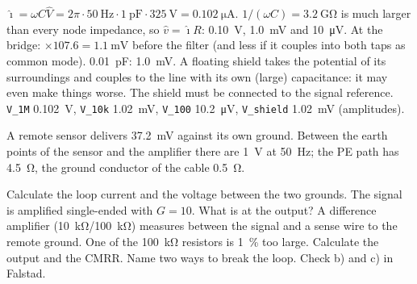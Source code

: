 \begin{solution}
\begin{talist}
\ta $\hat\imath = \omega C\hat V = 2\pi\cdot\SI{50}{\hertz}\cdot\SI{1}{\pico\farad}\cdot\SI{325}{\volt} = \SI{0.102}{\micro\ampere}$.
\ta $1/(\omega C) = \SI{3.2}{\giga\ohm}$ is much larger than every node impedance, so $\hat v = \hat\imath R$:
	\SI{0.10}{\volt}, \SI{1.0}{\milli\volt} and \SI{10}{\micro\volt}. At the bridge: $\times 107.6 = \SI{1.1}{\milli\volt}$ before
	the filter (and less if it couples into both taps as common mode).
\ta \SI{0.01}{\pico\farad}: \SI{1.0}{\milli\volt}.
\ta A floating shield takes the potential of its surroundings and couples to the line with its own (large) capacitance:
	it may even make things worse. The shield must be connected to the signal reference.
\ta {}\newline \texttt{V\_1M} \SI{0.102}{\volt}, \texttt{V\_10k} \SI{1.02}{\milli\volt},
	\texttt{V\_100} \SI{10.2}{\micro\volt}, \texttt{V\_shield} \SI{1.02}{\milli\volt} (amplitudes).
\end{talist}
\end{solution}

\label{ex:noise-loop}
A remote sensor delivers \SI{37.2}{\milli\volt} against its own ground. Between the earth points of the
sensor and the amplifier there are \SI{1}{\volt} at \SI{50}{\hertz}; the PE path has \SI{4.5}{\ohm}, the ground
conductor of the cable \SI{0.5}{\ohm}.
\begin{talist}
\ta Calculate the loop current and the voltage between the two grounds.
\ta The signal is amplified single-ended with $G=10$. What is at the output?
\ta A difference amplifier (\SI{10}{\kilo\ohm}/\SI{100}{\kilo\ohm}) measures between the signal and a sense wire to the remote ground.
	One of the \SI{100}{\kilo\ohm} resistors is \SI{1}{\percent} too large. Calculate the output and the CMRR.
\ta Name two ways to break the loop.
\ta Check b) and c) in Falstad.
\end{talist}

